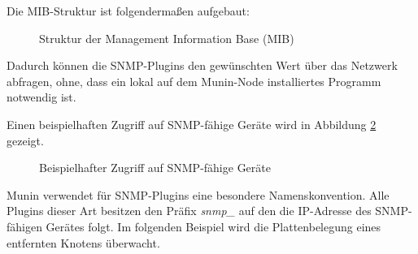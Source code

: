 Die MIB-Struktur ist folgendermaßen aufgebaut:

\begin{figure}[ht]
	\centering
		\caption[Struktur der Management Information Base (MIB)]{Struktur der Management Information Base (MIB)\protect\footnotemark}
		\label{munin-mib}
\end{figure}
Dadurch können die SNMP-Plugins den gewünschten Wert über das Netzwerk abfragen, ohne, dass ein lokal auf dem Munin-Node installiertes Programm notwendig ist.

\newpage

Einen beispielhaften Zugriff auf SNMP-fähige Geräte wird in Abbildung \ref{munin-snmp} gezeigt.

\begin{figure}[ht]
	\centering
		\caption[Beispielhafter Zugriff auf SNMP-fähige Geräte]{Beispielhafter Zugriff auf SNMP-fähige Geräte\protect\footnotemark}
		\label{munin-snmp}
\end{figure}

Munin verwendet für SNMP-Plugins eine besondere Namenskonvention.
Alle Plugins dieser Art besitzen den Präfix \textit{snmp\_} auf den die IP-Adresse des SNMP-fähigen Gerätes folgt.
Im folgenden Beispiel wird die Plattenbelegung eines entfernten Knotens überwacht.

